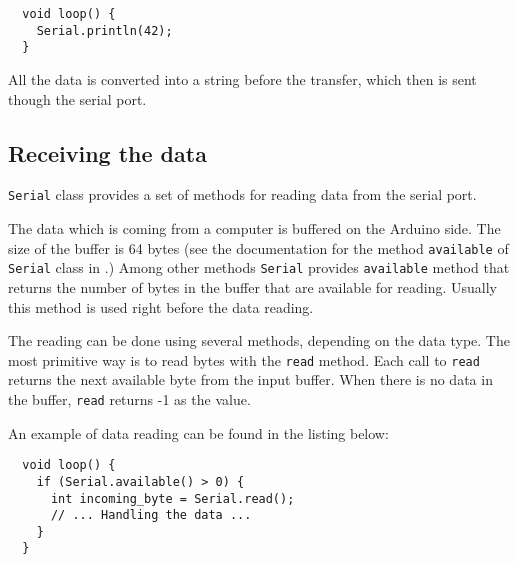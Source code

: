 \documentclass[../sparc.tex]{subfiles}
\begin{document}
\begin{verbatim}
  void loop() {
    Serial.println(42);
  }
\end{verbatim}

All the data is converted into a string before the transfer, which then is sent
though the serial port.

\subsection{Receiving the data}

\texttt{Serial} class provides a set of methods for reading data from the serial
port.

The data which is coming from a computer is buffered on the Arduino side.  The
size of the buffer is 64 bytes (see the documentation for the method
\texttt{available} of \texttt{Serial} class in \cite{arduino:reference}.)  Among
other methods \texttt{Serial} provides \texttt{available} method that returns
the number of bytes in the buffer that are available for reading.  Usually this
method is used right before the data reading.

The reading can be done using several methods, depending on the data type.  The
most primitive way is to read bytes with the \texttt{read} method.  Each call to
\texttt{read} returns the next available byte from the input buffer.  When there
is no data in the buffer, \texttt{read} returns -1 as the value.


An example of data reading can be found in the listing below:

\begin{verbatim}
  void loop() {
    if (Serial.available() > 0) {
      int incoming_byte = Serial.read();
      // ... Handling the data ...
    }
  }
\end{verbatim}
\end{document}
